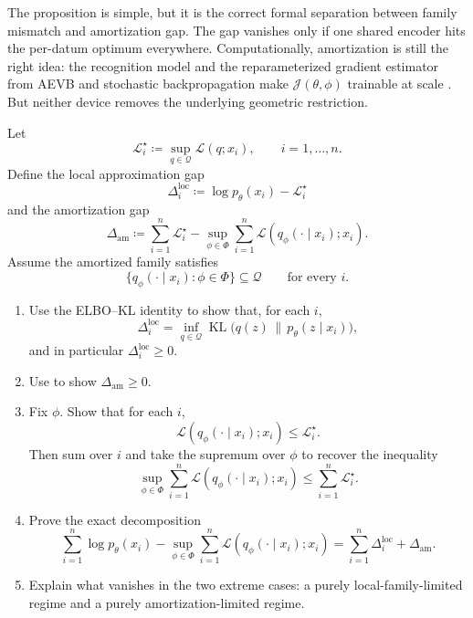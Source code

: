 \documentclass[11pt]{article}
\begin{document}
The proposition is simple, but it is the correct formal separation between family mismatch and amortization gap.
The gap vanishes only if one shared encoder hits the per-datum optimum everywhere.
Computationally, amortization is still the right idea:
the recognition model and the reparameterized gradient estimator from AEVB and stochastic backpropagation make \(\mathcal{J}(\theta,\phi)\) trainable at scale
\citep[\S\S2.1--2.3]{kingma_welling_2014_aevb}
\citep[\S\S1, 3]{rezende_mohamed_wierstra_2014_stochastic_backpropagation}.
But neither device removes the underlying geometric restriction.

\begin{exercise}
\label{ex:amortization-gap}
Let
\[
  \mathcal{L}_i^\star
  \coloneqq
  \sup_{q\in\mathcal{Q}}\mathcal{L}(q;x_i),
  \qquad i=1,\dots,n.
\]
Define the local approximation gap
\[
  \Delta_i^{\mathrm{loc}}
  \coloneqq
  \log p_\theta(x_i)-\mathcal{L}_i^\star
\]
and the amortization gap
\[
  \Delta_{\mathrm{am}}
  \coloneqq
  \sum_{i=1}^n \mathcal{L}_i^\star
  -
  \sup_{\phi\in\Phi}\sum_{i=1}^n \mathcal{L}(q_\phi(\cdot\mid x_i);x_i).
\]
Assume the amortized family satisfies
\[
  \{q_\phi(\cdot\mid x_i):\phi\in\Phi\}\subseteq \mathcal{Q}
  \qquad\text{for every }i.
\]
\begin{enumerate}[leftmargin=*]
  \item Use the ELBO--KL identity to show that, for each \(i\),
  \[
    \Delta_i^{\mathrm{loc}}
    =
    \inf_{q\in\mathcal{Q}}
    \operatorname{KL}\!\bigl(q(z)\,\|\,p_\theta(z\mid x_i)\bigr),
  \]
  and in particular \(\Delta_i^{\mathrm{loc}}\ge 0\).
  \item Use  to show \(\Delta_{\mathrm{am}}\ge 0\).
  \item Fix \(\phi\). Show that for each \(i\),
  \[
    \mathcal{L}(q_\phi(\cdot\mid x_i);x_i)\le \mathcal{L}_i^\star.
  \]
  Then sum over \(i\) and take the supremum over \(\phi\) to recover the inequality
  \[
    \sup_{\phi\in\Phi}\sum_{i=1}^n \mathcal{L}(q_\phi(\cdot\mid x_i);x_i)
    \le
    \sum_{i=1}^n \mathcal{L}_i^\star.
  \]
  \item Prove the exact decomposition
  \[
    \sum_{i=1}^n \log p_\theta(x_i)
    -
    \sup_{\phi\in\Phi}\sum_{i=1}^n \mathcal{L}(q_\phi(\cdot\mid x_i);x_i)
    =
    \sum_{i=1}^n \Delta_i^{\mathrm{loc}}
    +
    \Delta_{\mathrm{am}}.
  \]
  \item Explain what vanishes in the two extreme cases:
  a purely local-family-limited regime and a purely amortization-limited regime.
\end{enumerate}
\end{exercise}
\end{document}

